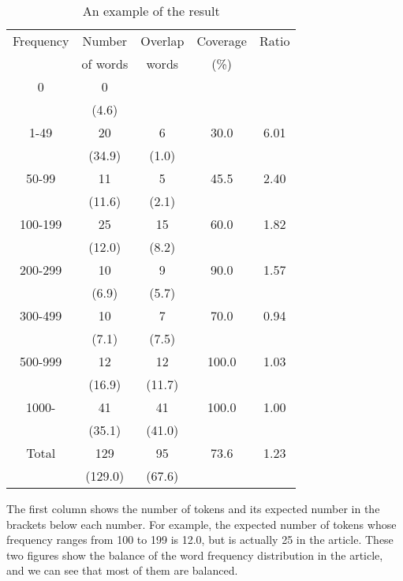 \begin{table}[hbt]
\begin{center}
\begin{tabular}{|c||c|c|c|c|}
\hline
{\tiny Frequency} & {\tiny Number} & {\tiny Overlap} & {\tiny Coverage} & {\tiny Ratio} \\
                  & {\tiny of words} &  {\tiny words} & {\tiny (\%)} &         \\
\hline

0       &    0      &          &          & \\
        &   (4.6)   &          &          & \\
1-49    &    20     &     6    &   30.0   &  6.01  \\
        &   (34.9)  &  (1.0)   &          & \\
50-99   &    11     &     5    &   45.5   &  2.40  \\
        &   (11.6)  &  (2.1)   &          & \\
100-199 &    25     &    15    &   60.0   &  1.82  \\
        &   (12.0)  &  (8.2)   &          & \\
200-299 &    10     &     9    &   90.0   &  1.57  \\
        &   (6.9)   &  (5.7)   &          & \\
300-499 &    10     &     7    &   70.0   &  0.94  \\
        &   (7.1)   &  (7.5)   &          & \\
500-999 &    12     &    12    &  100.0   &  1.03  \\
        &   (16.9)  & (11.7)   &          & \\
1000-   &    41     &    41    &  100.0   &  1.00  \\
        &   (35.1)  & (41.0)   &          & \\
\hline
Total   &   129     &   95    &    73.6   &  1.23  \\
        &  (129.0)  &  (67.6)  &          & \\
\hline
\end{tabular}
\caption{\label{T2} An example of the result}
\end{center}
\end{table}

The first column shows the number of tokens and its expected number
in the brackets below each number.
For example, the expected number of tokens whose frequency ranges from 100 to 199 is
12.0, but is actually 25 in the article.
These two figures show the balance of the word frequency distribution in the article,
and we can see that most of them are balanced.

